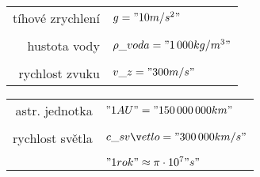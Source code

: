 \documentclass[vyfuk,\classoptions]{fksgeneric}
\begin{document}
\begin{framed}
\begin{multicols}{2}

\begin{center}
\begin{tabular}{r l}
tíhové zrychlení & $g = "10 m/s^2"$ \\ \\
hustota vody & $\rho\_{voda} = "1\,000 kg/m^3"$ \\ \\
rychlost zvuku & $v\_z = "300 m/s"$
\end{tabular}
\end{center}

\columnbreak

\begin{center}
\begin{tabular}{r l}
astr. jednotka & $"1 AU" = "150\,000\,000 km"$ \\ \\
rychlost světla & $c\_{světlo} = "300\,000 km/s"$ \\ \\
& $"1 rok" \approx \pi \cdot 10^7" s"$  
\end{tabular}
\end{center}
\end{multicols}
\end{framed}
\end{document}
